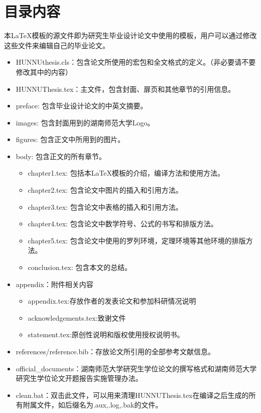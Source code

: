 \section{目录内容}
本\LaTeX{}模板的源文件即为研究生毕业设计论文中使用的模板，用户可以通过修改这些文件来编辑自己的毕业论文。
\begin{itemize}
	\item{HUNNUthesis.cls}：包含论文所使用的宏包和全文格式的定义。（非必要请不要修改其中的内容）
	\item{HUNNUThesis.tex}：主文件，包含封面、扉页和其他章节的引用信息。
	\item{preface}: 包含毕业设计论文的中英文摘要。
	\item{images}: 包含封面用到的湖南师范大学Logo。
	\item{figures}: 包含正文中所用到的图片。
	\item{body}: 包含正文的所有章节。
	      \begin{itemize}
		      \item{chapter1.tex}: 包括本\LaTeX{}模板的介绍，编译方法和使用方法。
		      \item{chapter2.tex}: 包含论文中图片的插入和引用方法。
		      \item{chapter3.tex}: 包含论文中表格的插入和引用方法。
		      \item{chapter4.tex}: 包含论文中数学符号、公式的书写和排版方法。
		      \item{chapter5.tex}: 包含论文中使用的罗列环境，定理环境等其他环境的排版方法。
		      \item{conclusion.tex}: 包含本文的总结。
	      \end{itemize}
	\item{appendix}：附件相关内容
	      \begin{itemize}
		      \item{appendix.tex}:存放作者的发表论文和参加科研情况说明
		      \item{acknowledgements.tex}:致谢文件
		      \item{statement.tex}:原创性说明和版权使用授权说明书。
	      \end{itemize}
	\item{references/reference.bib}：存放论文所引用的全部参考文献信息。
	\item{official\_documents}：湖南师范大学研究生学位论文的撰写格式和湖南师范大学研究生学位论文开题报告实施管理办法。
	\item{clean.bat}：双击此文件，可以用来清理HUNNUThesis.tex在编译之后生成的所有附属文件，如后缀名为.aux,.log,.bak的文件。
\end{itemize}

